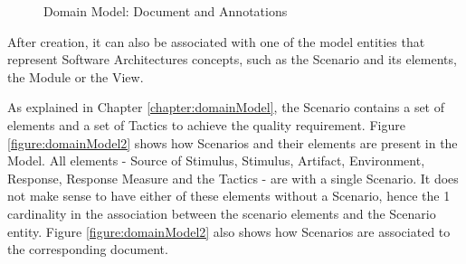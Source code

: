 \begin{figure}
\centering
\renewcommand {\umltextcolor}{black}
\renewcommand {\umlfillcolor}{none}
\renewcommand {\umldrawcolor}{black}

\caption{Domain Model: Document and Annotations}
\label{figure:domainModel1}
\end{figure} 

After creation, it can also be associated with one of the model entities that represent Software Architectures concepts, such as the Scenario and its elements, the Module or the View. 

As explained in Chapter \ref{chapter:domainModel}, the Scenario contains a set of elements and a set of Tactics to achieve the quality requirement. Figure \ref{figure:domainModel2} shows how Scenarios and their elements are present in the Model. All elements - Source of Stimulus, Stimulus, Artifact, Environment, Response, Response Measure and the Tactics - are with a single Scenario. It does not make sense to have either of these elements without a Scenario, hence the 1 cardinality in the association between the scenario elements and the Scenario entity. Figure \ref{figure:domainModel2} also shows how Scenarios are associated to the corresponding document.

